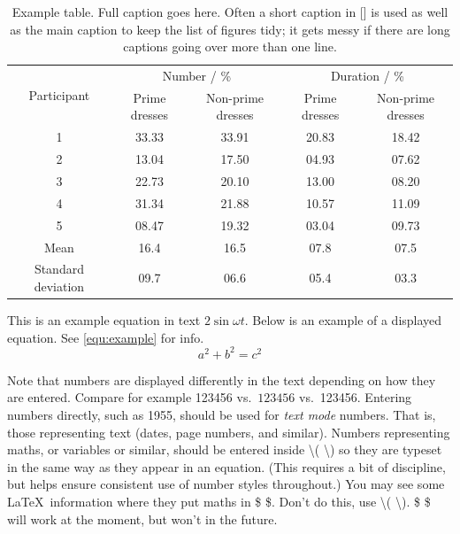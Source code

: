 \documentclass[times,12pt,thesis,online]{uom_thesis_casson} %
\newcommand{\otoprule}{\midrule[\heavyrulewidth]}
\begin{document}
    \begin{table}
      \centering
      \caption[Short caption for list of tables]{Example table. Full caption goes here. Often a short caption in [] is used as well as the main caption to keep the list of figures tidy; it gets messy if there are long captions going over more than one line.}
      \label{table:example_tabular}
      \begin{tabular}{ccccc}
        \toprule
        \multirow{2}{*}{Participant} & \multicolumn{2}{c}{Number / \%} & \multicolumn{2}{c}{Duration / \%} \\
                                     & Prime dresses & Non-prime dresses & Prime dresses & Non-prime dresses \\
	  \otoprule
        1  & 33.33 & 33.91 & 20.83 & 18.42 \\
        2  & 13.04 & 17.50 & 04.93 & 07.62 \\
        3  & 22.73 & 20.10 & 13.00 & 08.20 \\
        4  & 31.34 & 21.88 & 10.57 & 11.09 \\
        5  & 08.47 & 19.32 & 03.04 & 09.73 \\
        \hline
        Mean & 16.4 & 16.5 & 07.8 & 07.5 \\
        Standard deviation & 09.7 & 06.6 & 05.4 & 03.3 \\
        \bottomrule
      \end{tabular}
    \end{table}
  
    This is an example equation in text \(2\sin{\omega t}\). Below is an example of a displayed equation. See \ref{equ:example} for info.
    \begin{equation}
        a^{2} + b^{2} = c^{2} \label{equ:example}
    \end{equation}

    Note that numbers are displayed differently in the text depending on how they are entered. Compare for example 123456 vs.\ \(123456\) vs.\ \num{123456}. Entering numbers directly, such as 1955, should be used for \emph{text mode} numbers. That is, those representing text (dates, page numbers, and similar). Numbers representing maths, or variables or similar, should be entered inside \textbackslash( \textbackslash) 
    so they are typeset in the same way as they appear in an equation. (This requires a bit of discipline, but helps ensure consistent use of number styles throughout.) 
    You may see some \LaTeX\ information where they put maths in \$ \$. Don't do this, use \textbackslash( \textbackslash). \$ \$ will work at the moment, but won't in the future.
\end{document}
